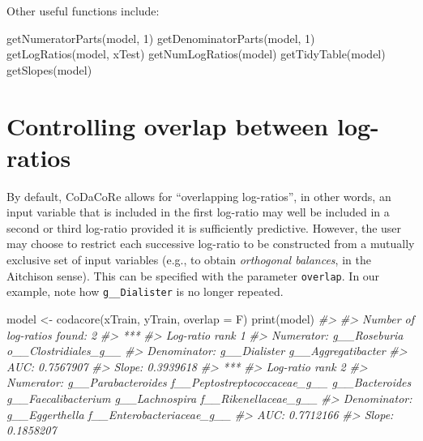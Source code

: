 \documentclass[
]{article}
\newenvironment{Shaded}{\begin{snugshade}}{\end{snugshade}}
\newcommand{\AttributeTok}[1]{\textcolor[rgb]{0.77,0.63,0.00}{#1}}
\newcommand{\CommentTok}[1]{\textcolor[rgb]{0.56,0.35,0.01}{\textit{#1}}}
\newcommand{\DecValTok}[1]{\textcolor[rgb]{0.00,0.00,0.81}{#1}}
\newcommand{\FunctionTok}[1]{\textcolor[rgb]{0.00,0.00,0.00}{#1}}
\newcommand{\NormalTok}[1]{#1}
\newcommand{\OtherTok}[1]{\textcolor[rgb]{0.56,0.35,0.01}{#1}}
\begin{document}
Other useful functions include:

\begin{Shaded}
\begin{Highlighting}[]
\FunctionTok{getNumeratorParts}\NormalTok{(model, }\DecValTok{1}\NormalTok{)}
\FunctionTok{getDenominatorParts}\NormalTok{(model, }\DecValTok{1}\NormalTok{)}
\FunctionTok{getLogRatios}\NormalTok{(model, xTest)}
\FunctionTok{getNumLogRatios}\NormalTok{(model)}
\FunctionTok{getTidyTable}\NormalTok{(model)}
\FunctionTok{getSlopes}\NormalTok{(model)}
\end{Highlighting}
\end{Shaded}

\hypertarget{controlling-overlap-between-log-ratios}{%
\section{Controlling overlap between
log-ratios}\label{controlling-overlap-between-log-ratios}}

By default, CoDaCoRe allows for ``overlapping log-ratios'', in other
words, an input variable that is included in the first log-ratio may
well be included in a second or third log-ratio provided it is
sufficiently predictive. However, the user may choose to restrict each
successive log-ratio to be constructed from a mutually exclusive set of
input variables (e.g., to obtain \emph{orthogonal balances}, in the
Aitchison sense). This can be specified with the parameter
\texttt{overlap}. In our example, note how \texttt{g\_\_Dialister} is no
longer repeated.

\begin{Shaded}
\begin{Highlighting}[]
\NormalTok{model }\OtherTok{\textless{}{-}} \FunctionTok{codacore}\NormalTok{(xTrain, yTrain, }\AttributeTok{overlap =}\NormalTok{ F)}
\FunctionTok{print}\NormalTok{(model)}
\CommentTok{\#\textgreater{} }
\CommentTok{\#\textgreater{} Number of log{-}ratios found: 2}
\CommentTok{\#\textgreater{} ***}
\CommentTok{\#\textgreater{} Log{-}ratio rank 1}
\CommentTok{\#\textgreater{} Numerator: g\_\_Roseburia o\_\_Clostridiales\_g\_\_}
\CommentTok{\#\textgreater{} Denominator: g\_\_Dialister g\_\_Aggregatibacter}
\CommentTok{\#\textgreater{} AUC: 0.7567907}
\CommentTok{\#\textgreater{} Slope: 0.3939618}
\CommentTok{\#\textgreater{} ***}
\CommentTok{\#\textgreater{} Log{-}ratio rank 2}
\CommentTok{\#\textgreater{} Numerator: g\_\_Parabacteroides f\_\_Peptostreptococcaceae\_g\_\_ g\_\_Bacteroides g\_\_Faecalibacterium g\_\_Lachnospira f\_\_Rikenellaceae\_g\_\_}
\CommentTok{\#\textgreater{} Denominator: g\_\_Eggerthella f\_\_Enterobacteriaceae\_g\_\_}
\CommentTok{\#\textgreater{} AUC: 0.7712166}
\CommentTok{\#\textgreater{} Slope: 0.1858207}
\end{Highlighting}
\end{Shaded}
\end{document}
